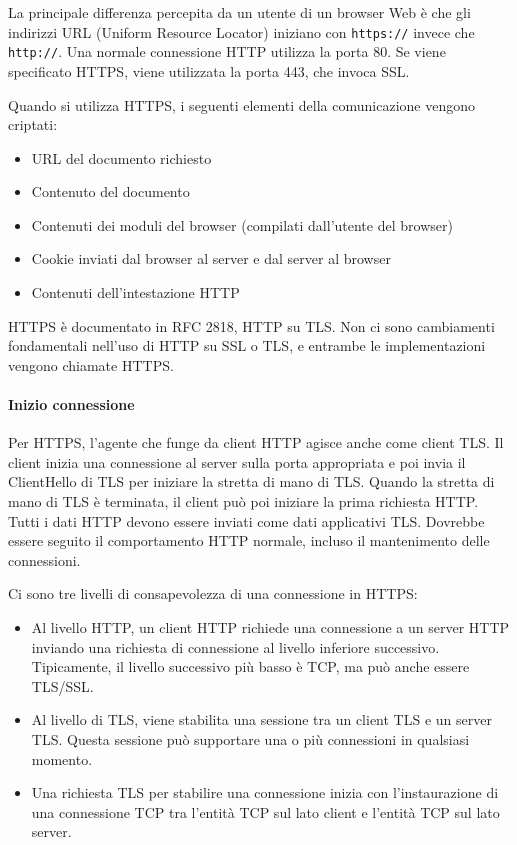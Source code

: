 \documentclass{article}
\theoremstyle{definition}
\begin{document}
La principale differenza percepita da un utente di un browser Web è che gli indirizzi URL (Uniform Resource Locator) iniziano con \texttt{https://} invece che \texttt{http://}. Una normale connessione HTTP utilizza la porta 80. Se viene specificato HTTPS, viene utilizzata la porta 443, che invoca SSL.

Quando si utilizza HTTPS, i seguenti elementi della comunicazione vengono criptati:
\begin{itemize}
    \item URL del documento richiesto
    \item Contenuto del documento
    \item Contenuti dei moduli del browser (compilati dall'utente del browser)
    \item Cookie inviati dal browser al server e dal server al browser
    \item Contenuti dell'intestazione HTTP
\end{itemize}

HTTPS è documentato in RFC 2818, HTTP su TLS. Non ci sono cambiamenti fondamentali nell'uso di HTTP su SSL o TLS, e entrambe le implementazioni vengono chiamate HTTPS.

\paragraph{Inizio connessione}
Per HTTPS, l'agente che funge da client HTTP agisce anche come client TLS. Il client inizia una connessione al server sulla porta appropriata e poi invia il ClientHello di TLS per iniziare la stretta di mano di TLS. Quando la stretta di mano di TLS è terminata, il client può poi iniziare la prima richiesta HTTP. Tutti i dati HTTP devono essere inviati come dati applicativi TLS. Dovrebbe essere seguito il comportamento HTTP normale, incluso il mantenimento delle connessioni.

Ci sono tre livelli di consapevolezza di una connessione in HTTPS:
\begin{itemize}
    \item Al livello HTTP, un client HTTP richiede una connessione a un server HTTP inviando una richiesta di connessione al livello inferiore successivo. Tipicamente, il livello successivo più basso è TCP, ma può anche essere TLS/SSL.
    \item Al livello di TLS, viene stabilita una sessione tra un client TLS e un server TLS. Questa sessione può supportare una o più connessioni in qualsiasi momento.
    \item Una richiesta TLS per stabilire una connessione inizia con l'instaurazione di una connessione TCP tra l'entità TCP sul lato client e l'entità TCP sul lato server.
\end{itemize}
\end{document}
